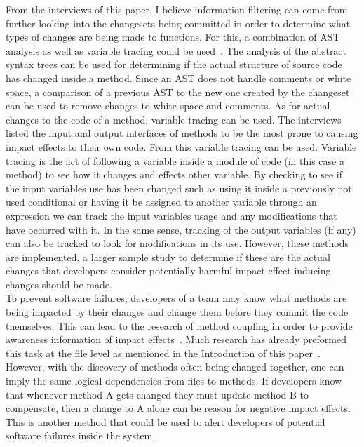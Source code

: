 \documentclass[conference]{IEEEtran}
\begin{document}
From the interviews of this paper, I believe information filtering can come from further 
looking into the changesets being committed in order to determine what types of changes
are being made to functions. For this, a combination of AST analysis as well as variable
tracing could be used~\cite{Neamtiu:2005:USC, Horwitz:1990:IST}. 
The analysis of the abstract syntax trees can be used for determining
if the actual structure of source code has changed inside a method. Since an AST does not
handle comments or white space, a comparison of a previous AST to the new one created by
the changeset can be used to remove changes to white space and comments. As for actual
changes to the code of a method, variable tracing can be used. The interviews listed the
input and output interfaces of methods to be the most prone to causing impact effects
to their own code. From this variable tracing can be used. Variable tracing is the act of following
a variable inside a module of code (in this case a method) to see how it changes and effects
other variable. By checking to see if the input variables use has been changed such as
using it inside a previously not used conditional or having it be assigned to another variable
through an expression we can track the input variables usage and any modifications that
have occurred with it. In the same sense, tracking of the output variables (if any) can 
also be tracked to look for modifications in its use. However, these methods are implemented,
a larger sample study to determine if these are the actual changes that developers consider
potentially harmful impact effect inducing changes should be made. \\

To prevent software failures, developers of a team may know what methods are being
impacted by their changes and change them before they commit the code themselves.
This can lead to the research of method coupling in order to provide awareness information
of impact effects~\cite{DAmbros:2006:ERV}. Much research has already preformed this task at the file level as mentioned
in the Introduction of this paper~\cite{Beyer:2005:CSA}. However, with the discovery of methods often being changed 
together, one can imply the same logical dependencies from files to methods. If developers
know that whenever method A gets changed they must update method B to compensate,
then a change to A alone can be reason for negative impact effects. This is another method
that could be used to alert developers of potential software failures inside the system.\\
\end{document}
